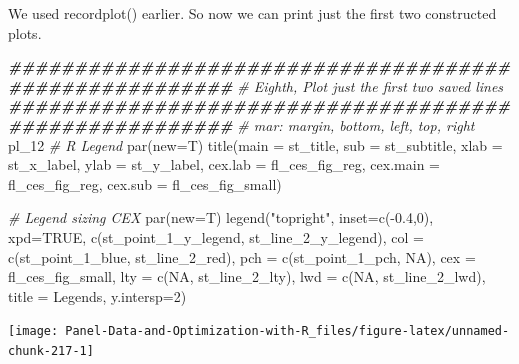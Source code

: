 \documentclass[
]{book}
\newenvironment{Shaded}{\begin{snugshade}}{\end{snugshade}}
\newcommand{\AttributeTok}[1]{\textcolor[rgb]{0.77,0.63,0.00}{#1}}
\newcommand{\CommentTok}[1]{\textcolor[rgb]{0.56,0.35,0.01}{\textit{#1}}}
\newcommand{\ConstantTok}[1]{\textcolor[rgb]{0.00,0.00,0.00}{#1}}
\newcommand{\DecValTok}[1]{\textcolor[rgb]{0.00,0.00,0.81}{#1}}
\newcommand{\DocumentationTok}[1]{\textcolor[rgb]{0.56,0.35,0.01}{\textbf{\textit{#1}}}}
\newcommand{\FloatTok}[1]{\textcolor[rgb]{0.00,0.00,0.81}{#1}}
\newcommand{\FunctionTok}[1]{\textcolor[rgb]{0.00,0.00,0.00}{#1}}
\newcommand{\NormalTok}[1]{#1}
\newcommand{\SpecialCharTok}[1]{\textcolor[rgb]{0.00,0.00,0.00}{#1}}
\newcommand{\StringTok}[1]{\textcolor[rgb]{0.31,0.60,0.02}{#1}}
\begin{document}
We used recordplot() earlier. So now we can print just the first two constructed plots.

\begin{Shaded}
\begin{Highlighting}[]
\DocumentationTok{\#\#\#\#\#\#\#\#\#\#\#\#\#\#\#\#\#\#\#\#\#\#\#\#\#\#\#\#\#\#\#\#\#\#\#\#\#\#\#\#\#\#\#\#\#\#\#\#\#\#\#\#\#\#\#}
\CommentTok{\# Eighth, Plot just the first two saved lines}
\DocumentationTok{\#\#\#\#\#\#\#\#\#\#\#\#\#\#\#\#\#\#\#\#\#\#\#\#\#\#\#\#\#\#\#\#\#\#\#\#\#\#\#\#\#\#\#\#\#\#\#\#\#\#\#\#\#\#\#}
\CommentTok{\# mar: margin, bottom, left, top, right}
\NormalTok{pl\_12}
\CommentTok{\# R Legend}
\FunctionTok{par}\NormalTok{(}\AttributeTok{new=}\NormalTok{T)}
\FunctionTok{title}\NormalTok{(}\AttributeTok{main =}\NormalTok{ st\_title, }\AttributeTok{sub =}\NormalTok{ st\_subtitle, }\AttributeTok{xlab =}\NormalTok{ st\_x\_label, }\AttributeTok{ylab =}\NormalTok{ st\_y\_label,}
      \AttributeTok{cex.lab =}\NormalTok{ fl\_ces\_fig\_reg,}
      \AttributeTok{cex.main =}\NormalTok{ fl\_ces\_fig\_reg,}
      \AttributeTok{cex.sub =}\NormalTok{ fl\_ces\_fig\_small)}

\CommentTok{\# Legend sizing CEX}
\FunctionTok{par}\NormalTok{(}\AttributeTok{new=}\NormalTok{T)}
\FunctionTok{legend}\NormalTok{(}\StringTok{"topright"}\NormalTok{,}
       \AttributeTok{inset=}\FunctionTok{c}\NormalTok{(}\SpecialCharTok{{-}}\FloatTok{0.4}\NormalTok{,}\DecValTok{0}\NormalTok{),}
       \AttributeTok{xpd=}\ConstantTok{TRUE}\NormalTok{,}
       \FunctionTok{c}\NormalTok{(st\_point\_1\_y\_legend, st\_line\_2\_y\_legend),}
       \AttributeTok{col =} \FunctionTok{c}\NormalTok{(st\_point\_1\_blue, st\_line\_2\_red),}
       \AttributeTok{pch =} \FunctionTok{c}\NormalTok{(st\_point\_1\_pch, }\ConstantTok{NA}\NormalTok{),}
       \AttributeTok{cex =}\NormalTok{ fl\_ces\_fig\_small,}
       \AttributeTok{lty =} \FunctionTok{c}\NormalTok{(}\ConstantTok{NA}\NormalTok{, st\_line\_2\_lty),}
       \AttributeTok{lwd =} \FunctionTok{c}\NormalTok{(}\ConstantTok{NA}\NormalTok{, st\_line\_2\_lwd),}
       \AttributeTok{title =} \StringTok{\textquotesingle{}Legends\textquotesingle{}}\NormalTok{,}
       \AttributeTok{y.intersp=}\DecValTok{2}\NormalTok{)}
\end{Highlighting}
\end{Shaded}

\begin{center}\texttt{[image: Panel-Data-and-Optimization-with-R\_files/figure-latex/unnamed-chunk-217-1]} \end{center}
\end{document}
